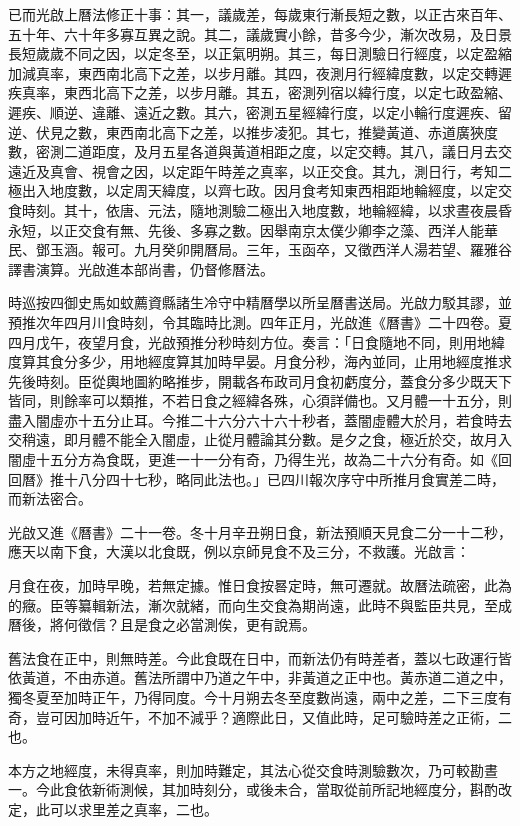 已而光啟上曆法修正十事：其一，議歲差，每歲東行漸長短之數，以正古來百年、五十年、六十年多寡互異之說。其二，議歲實小餘，昔多今少，漸次改易，及日景長短歲歲不同之因，以定冬至，以正氣明朔。其三，每日測驗日行經度，以定盈縮加減真率，東西南北高下之差，以步月離。其四，夜測月行經緯度數，以定交轉遲疾真率，東西北高下之差，以步月離。其五，密測列宿以緯行度，以定七政盈縮、遲疾、順逆、違離、遠近之數。其六，密測五星經緯行度，以定小輪行度遲疾、留逆、伏見之數，東西南北高下之差，以推步凌犯。其七，推變黃道、赤道廣狹度數，密測二道距度，及月五星各道與黃道相距之度，以定交轉。其八，議日月去交遠近及真會、視會之因，以定距午時差之真率，以正交食。其九，測日行，考知二極出入地度數，以定周天緯度，以齊七政。因月食考知東西相距地輪經度，以定交食時刻。其十，依唐、元法，隨地測驗二極出入地度數，地輪經緯，以求晝夜晨昏永短，以正交食有無、先後、多寡之數。因舉南京太僕少卿李之藻、西洋人能華民、鄧玉涵。報可。九月癸卯開曆局。三年，玉函卒，又徵西洋人湯若望、羅雅谷譯書演算。光啟進本部尚書，仍督修曆法。

時巡按四御史馬如蚊薦資縣諸生冷守中精曆學以所呈曆書送局。光啟力駁其謬，並預推次年四月川食時刻，令其臨時比測。四年正月，光啟進《曆書》二十四卷。夏四月戊午，夜望月食，光啟預推分秒時刻方位。奏言：「日食隨地不同，則用地緯度算其食分多少，用地經度算其加時早晏。月食分秒，海內並同，止用地經度推求先後時刻。臣從輿地圖約略推步，開載各布政司月食初虧度分，蓋食分多少既天下皆同，則餘率可以類推，不若日食之經緯各殊，心須詳備也。又月體一十五分，則盡入闇虛亦十五分止耳。今推二十六分六十六十秒者，蓋闇虛體大於月，若食時去交稍遠，即月體不能全入闇虛，止從月體論其分數。是夕之食，極近於交，故月入闇虛十五分方為食既，更進一十一分有奇，乃得生光，故為二十六分有奇。如《回回曆》推十八分四十七秒，略同此法也。」已四川報次序守中所推月食實差二時，而新法密合。

光啟又進《曆書》二十一卷。冬十月辛丑朔日食，新法預順天見食二分一十二秒，應天以南下食，大漢以北食既，例以京師見食不及三分，不救護。光啟言：

月食在夜，加時早晚，若無定據。惟日食按晷定時，無可遷就。故曆法疏密，此為的癥。臣等纂輯新法，漸次就緒，而向生交食為期尚遠，此時不與監臣共見，至成曆後，將何徵信？且是食之必當測俟，更有說焉。

舊法食在正中，則無時差。今此食既在日中，而新法仍有時差者，蓋以七政運行皆依黃道，不由赤道。舊法所謂中乃道之午中，非黃道之正中也。黃赤道二道之中，獨冬夏至加時正午，乃得同度。今十月朔去冬至度數尚遠，兩中之差，二下三度有奇，豈可因加時近午，不加不減乎？適際此日，又值此時，足可驗時差之正術，二也。

本方之地經度，未得真率，則加時難定，其法心從交食時測驗數次，乃可較勘晝一。今此食依新術測候，其加時刻分，或後未合，當取從前所記地經度分，斟酌改定，此可以求里差之真率，二也。

